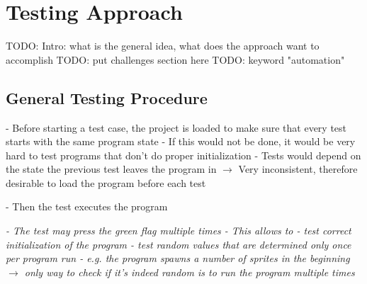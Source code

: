 
\chapter{Testing Approach}

TODO: Intro: what is the general idea, what does the approach want to accomplish
TODO: put challenges section here
TODO: keyword "automation"

\section{General Testing Procedure}

- Before starting a test case, the project is loaded to make sure that every test starts with the same program state
    - If this would not be done, it would be very hard to test programs that don't do proper initialization
    - Tests would depend on the state the previous test leaves the program in
    $\rightarrow$ Very inconsistent, therefore desirable to load the program before each test

- Then the test executes the program

\textit{- The test may press the green flag multiple times
- This allows to
    - test correct initialization of the program
    - test random values that are determined only once per program run
        - e.g. the program spawns a number of sprites in the beginning
        $\rightarrow$ only way to check if it's indeed random is to run the program multiple times
    }


